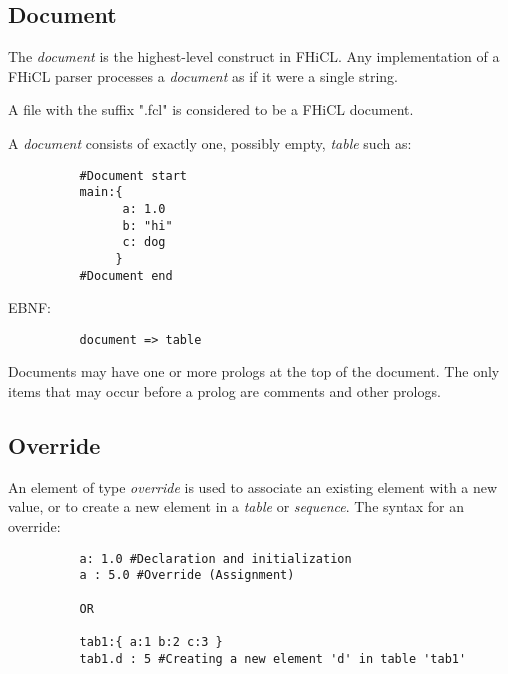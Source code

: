 \documentclass{memarticle}
\begin{document}
{                \subsection{Document}
                        The \emph{document} is the highest-level construct 
                        in FHiCL.
                        Any implementation of a FHiCL parser
                        processes a \emph{document}
                        as if it were a single string.
                        \par
                        A file with the suffix ".fcl"
                        is considered to be a FHiCL document.
                        \par
                        A \emph{document} consists of exactly one,
                        possibly empty,
                        \emph{table} such as:
                        \begin{verbatim}
          #Document start
          main:{
                a: 1.0
                b: "hi"
                c: dog
               }
          #Document end
                        \end{verbatim}  
                        EBNF:
                        \begin{verbatim}
          document => table
                        \end{verbatim}
                        \par
                        Documents may have one or more prologs at the top of the document.
                        The only items that may occur before a prolog are comments and other prologs.
                \subsection{Override}
                        An element of type \emph{override} is used to associate 
                        an existing element with a new value,
                        or to create a new element in a \emph{table} or \emph{sequence}.
                        The syntax for an override:
                        \begin{verbatim}
          a: 1.0 #Declaration and initialization
          a : 5.0 #Override (Assignment)
                                
          OR
                                
          tab1:{ a:1 b:2 c:3 }
          tab1.d : 5 #Creating a new element 'd' in table 'tab1'
                                

\end{verbatim}}
\end{document}

